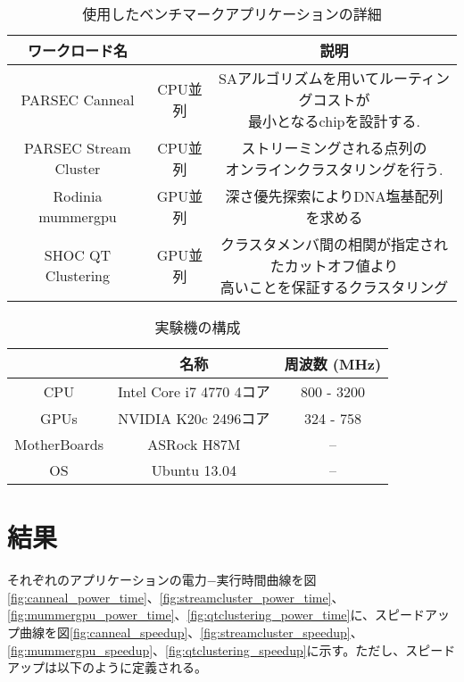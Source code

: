 \begin{table}[t]
\begin{center}\begin{tabular}{|c|c|c|}
\hline ワークロード名 & & 説明 \\
\hline PARSEC Canneal & CPU並列 & \shortstack{SAアルゴリズムを用いてルーティングコストが\\最小となるchipを設計する. }\\
\hline PARSEC Stream Cluster & CPU並列 & \shortstack{ストリーミングされる点列の\\オンラインクラスタリングを行う. }\\
\hline Rodinia mummergpu & GPU並列 & 深さ優先探索によりDNA塩基配列を求める\\
\hline SHOC QT Clustering & GPU並列 & \shortstack{クラスタメンバ間の相関が指定されたカットオフ値より\\高いことを保証するクラスタリング}\\
\hline \end{tabular} \caption{使用したベンチマークアプリケーションの詳細}\label{tbl:parsec}
\end{center}
\end{table}

\begin{table}[h]
    \centering
    \begin{tabular}{|c|c|c|}
        \hline
                     & 名称  &  周波数 (MHz) \\ \hline
        CPU          & Intel Core i7 4770 4コア & 800 - 3200   \\ \hline
        GPUs         & NVIDIA K20c 2496コア         & 324 - 758  \\ \hline
        MotherBoards & ASRock H87M & -- \\ \hline
        OS           & Ubuntu 13.04 &  -- \\ \hline
    \end{tabular}
    \caption{実験機の構成}
    \label{tab:machine-setup}
\end{table}



\section{結果}
\label{sec:result}

それぞれのアプリケーションの電力−実行時間曲線を図\ref{fig:canneal_power_time}、\ref{fig:streamcluster_power_time}、\ref{fig:mummergpu_power_time}、\ref{fig:qtclustering_power_time}に、スピードアップ曲線を図\ref{fig:canneal_speedup}、\ref{fig:streamcluster_speedup}、\ref{fig:mummergpu_speedup}、\ref{fig:qtclustering_speedup}に示す。ただし、スピードアップは以下のように定義される。

